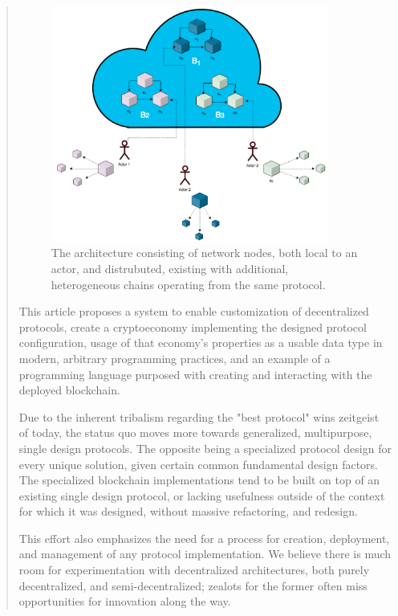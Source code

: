 \documentclass[12pt, titlepage, twocolumn]{report}
\begin{document}
\begin{quotation}
\begin{figure}[ht]
\centering
	\includegraphics[width=0.9\textwidth]{kunta_arch}
	\caption{The architecture consisting of network nodes, both local to an actor, and distrubuted, existing with additional, heterogeneous chains operating from the same protocol.}
	\label{kunta_arch}
\end{figure}

This article proposes a system to enable customization of decentralized protocols, create a cryptoeconomy implementing the designed protocol configuration, usage of that economy's properties as a usable data type in modern, arbitrary programming practices, and an example of a programming language purposed with creating and interacting with the deployed blockchain.

Due to the inherent tribalism regarding the "best protocol" wins zeitgeist of today, the status quo moves more towards generalized, multipurpose, single design protocols. The opposite being a specialized protocol design for every unique solution, given certain common fundamental design factors. The specialized blockchain implementations tend to be built on top of an existing single design protocol, or lacking usefulness outside of the context for which it was designed, without massive refactoring, and redesign.

This effort also emphasizes the need for a process for creation, deployment, and management of any protocol implementation. We believe there is much room for experimentation with decentralized architectures, both purely decentralized, and semi-decentralized; zealots for the former often miss opportunities for innovation along the way.


\end{quotation}
\end{document}
